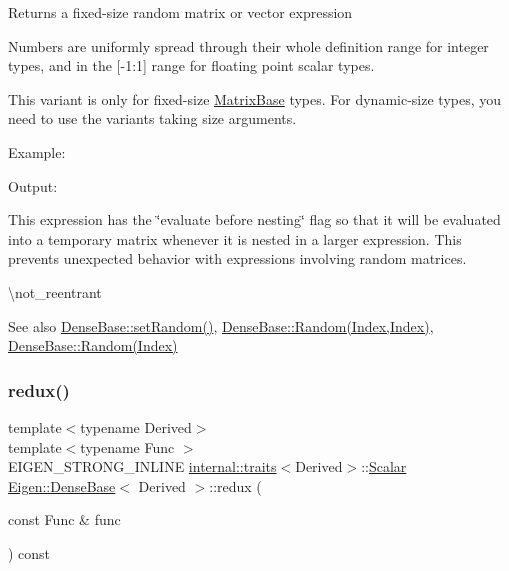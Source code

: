 \begin{DoxyReturn}{Returns}
a fixed-\/size random matrix or vector expression
\end{DoxyReturn}
Numbers are uniformly spread through their whole definition range for integer types, and in the \mbox{[}-\/1\+:1\mbox{]} range for floating point scalar types.

This variant is only for fixed-\/size \mbox{\hyperlink{class_eigen_1_1_matrix_base}{Matrix\+Base}} types. For dynamic-\/size types, you need to use the variants taking size arguments.

Example\+: 
\begin{DoxyCodeInclude}{0}
\end{DoxyCodeInclude}
 Output\+: 
\begin{DoxyVerbInclude}
\end{DoxyVerbInclude}


This expression has the \char`\"{}evaluate before nesting\char`\"{} flag so that it will be evaluated into a temporary matrix whenever it is nested in a larger expression. This prevents unexpected behavior with expressions involving random matrices.

\textbackslash{}not\+\_\+reentrant

\begin{DoxySeeAlso}{See also}
\mbox{\hyperlink{class_eigen_1_1_dense_base_ac476e5852129ba32beaa1a8a3d7ee0db}{Dense\+Base\+::set\+Random()}}, \mbox{\hyperlink{class_eigen_1_1_dense_base_ae97f8d9d08f969c733c8144be6225756}{Dense\+Base\+::\+Random(\+Index,\+Index)}}, \mbox{\hyperlink{class_eigen_1_1_dense_base_a7eb5f974a8f0b67eac7080db1da0e308}{Dense\+Base\+::\+Random(\+Index)}} 
\end{DoxySeeAlso}
\mbox{\label{class_eigen_1_1_dense_base_ae2a645f73c87aa77857035a02a0d9778}} 
\subsubsection{\texorpdfstring{redux()}{redux()}}
{\footnotesize\ttfamily template$<$typename Derived$>$ \\
template$<$typename Func $>$ \\
E\+I\+G\+E\+N\+\_\+\+S\+T\+R\+O\+N\+G\+\_\+\+I\+N\+L\+I\+NE \mbox{\hyperlink{struct_eigen_1_1internal_1_1traits}{internal\+::traits}}$<$Derived$>$\+::\mbox{\hyperlink{class_eigen_1_1_dense_base_a5feed465b3a8e60c47e73ecce83e39a2}{Scalar}} \mbox{\hyperlink{class_eigen_1_1_dense_base}{Eigen\+::\+Dense\+Base}}$<$ Derived $>$\+::redux (\begin{DoxyParamCaption}\item[{const Func \&}]{func }\end{DoxyParamCaption}) const}

